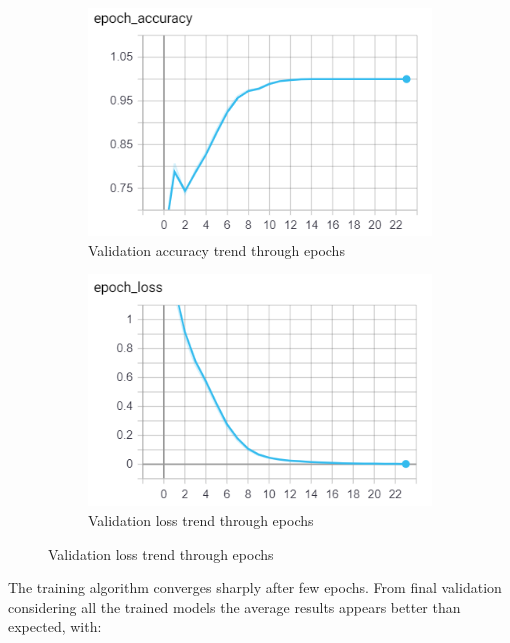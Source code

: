 \begin{center}
	\begin{figure}[H]
		\begin{subfigure}[H]{0.45\textwidth}
			\hfill\includegraphics[scale=0.8]{figures/last_model_val_acc.png}\vspace*{\fill}
			\caption{Validation accuracy trend through epochs}\label{fig:8a}
		\end{subfigure}
		\begin{subfigure}[H]{0.45\textwidth}
			\hfill\includegraphics[scale=0.8]{figures/last_model_val_loss.png}\vspace*{\fill}
			\caption{Validation loss trend through epochs}\label{fig:8b}
		\end{subfigure}
	\end{figure} 
\end{center}
The training algorithm converges sharply after few epochs. From final validation considering all the trained models the average results appears better than expected, with:\\


